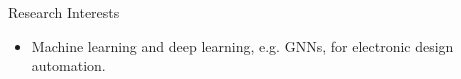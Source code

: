 
\begin{rSection}{Research Interests}
    
\begin{itemize}
    \item Machine learning and deep learning, e.g. GNNs, for electronic design automation.
\end{itemize}
\end{rSection}




